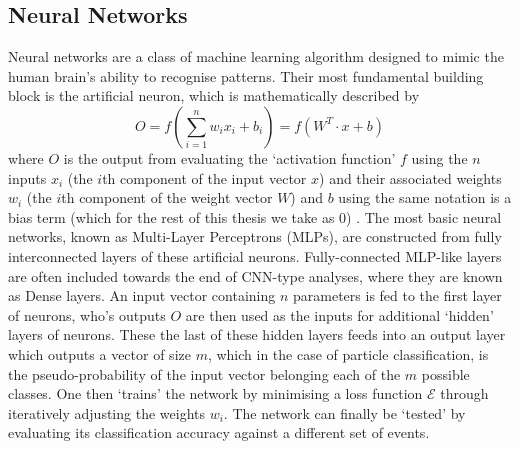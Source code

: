 \subsection{Neural Networks}
Neural networks are a class of machine learning algorithm designed to mimic the human brain's ability to recognise patterns. Their most fundamental building block is the artificial neuron, which is mathematically described by
\begin{equation}
O=\mathit{f}(\sum_{i=1}^{n}w_ix_i+b_i)=\mathit{f}(W^T\cdot x +b)
\end{equation}
where $O$ is the output from evaluating the `activation function' $\mathit{f}$ using the $n$ inputs $x_i$ (the $i$th component of the input vector $x$) and their associated weights $w_i$ (the $i$th component of the weight vector $W$) and $b$ using the same notation is a bias term (which for the rest of this thesis we take as 0) \cite{C++CNN}. The most basic neural networks, known as Multi-Layer Perceptrons (MLPs), are constructed from fully interconnected layers of these artificial neurons. Fully-connected MLP-like layers are often included towards the end of CNN-type analyses, where they are known as Dense layers. An input vector containing $n$ parameters is fed to the first layer of neurons, who's outputs $O$ are then used as the inputs for additional `hidden' layers of neurons. These the last of these hidden layers feeds into an output layer which outputs a vector of size $m$, which in the case of particle classification, is the pseudo-probability of the input vector belonging each of the $m$ possible classes. One then `trains' the network by minimising a loss function $\mathcal{E}$ through iteratively adjusting the weights $w_i$.
The network can finally be `tested' by evaluating its classification accuracy against a different set of events.

